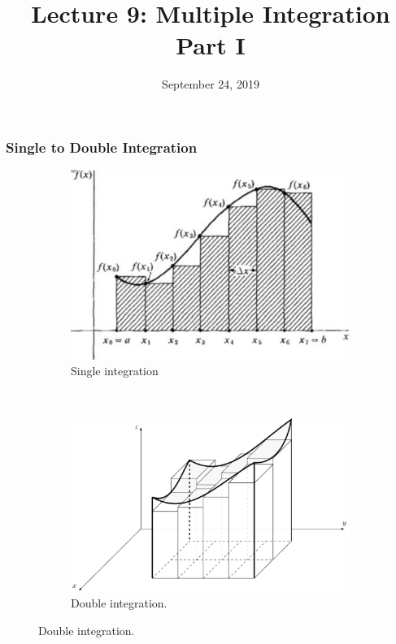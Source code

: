 \documentclass{beamer}
\title{Lecture 9: Multiple Integration Part I}
\date{September 24, 2019}
\begin{document}
	
\frame{\titlepage}

\begin{frame}
\frametitle{\textbf{Single to Double Integration}}
\begin{figure}
	\centering
	\begin{subfigure}{0.48\textwidth}
		
		\includegraphics[width=\textwidth]{IMG_0380.jpg}
		\hspace*{10pt}\hbox{}
		\caption{Single integration}
	\end{subfigure}%
	~ 
	\begin{subfigure}{0.48\textwidth}
	
		\includegraphics[width=\textwidth]{IMG_0385.jpg}
		\hspace*{10pt}\hbox{}
		\caption{Double integration.}
		\label{fig:2}
	\end{subfigure}
\end{figure}

\end{frame}
\end{document}
